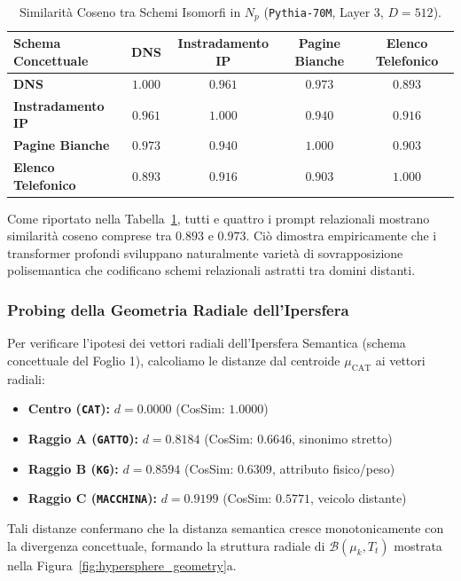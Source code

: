 \documentclass[11pt,a4paper]{article}
\theoremstyle{definition}
\begin{document}
\begin{table}[t]
\centering
\caption{Similarità Coseno tra Schemi Isomorfi in $N_p$ (\texttt{Pythia-70M}, Layer 3, $D=512$).}
\label{tab:pythia_cosine}
\vspace{0.15cm}
\small
\setlength{\tabcolsep}{6.0pt}
\begin{tabular}{@{}lcccc@{}}
\toprule
\textbf{Schema Concettuale} & \textbf{DNS} & \textbf{Instradamento IP} & \textbf{Pagine Bianche} & \textbf{Elenco Telefonico} \\ \midrule
\textbf{DNS} & $1.000$ & $0.961$ & $0.973$ & $0.893$ \\
\textbf{Instradamento IP} & $0.961$ & $1.000$ & $0.940$ & $0.916$ \\
\textbf{Pagine Bianche} & $0.973$ & $0.940$ & $1.000$ & $0.903$ \\
\textbf{Elenco Telefonico} & $0.893$ & $0.916$ & $0.903$ & $1.000$ \\ \bottomrule
\end{tabular}
\end{table}

Come riportato nella Tabella~\ref{tab:pythia_cosine}, tutti e quattro i prompt relazionali mostrano similarità coseno comprese tra $\mathbf{0.893}$ e $\mathbf{0.973}$. Ciò dimostra empiricamente che i transformer profondi sviluppano naturalmente varietà di sovrapposizione polisemantica che codificano schemi relazionali astratti tra domini distanti.

\subsubsection{Probing della Geometria Radiale dell'Ipersfera}
Per verificare l'ipotesi dei vettori radiali dell'Ipersfera Semantica (schema concettuale del Foglio 1), calcoliamo le distanze dal centroide $\mu_{\mathrm{CAT}}$ ai vettori radiali:
\begin{itemize}[leftmargin=*, itemsep=2.0pt]
    \item \textbf{Centro (\texttt{CAT}):} $d = 0.0000$ (CosSim: $1.0000$)
    \item \textbf{Raggio A (\texttt{GATTO}):} $d = 0.8184$ (CosSim: $0.6646$, sinonimo stretto)
    \item \textbf{Raggio B (\texttt{KG}):} $d = 0.8594$ (CosSim: $0.6309$, attributo fisico/peso)
    \item \textbf{Raggio C (\texttt{MACCHINA}):} $d = 0.9199$ (CosSim: $0.5771$, veicolo distante)
\end{itemize}
Tali distanze confermano che la distanza semantica cresce monotonicamente con la divergenza concettuale, formando la struttura radiale di $\mathcal{B}(\mu_k, T_t)$ mostrata nella Figura~\ref{fig:hypersphere_geometry}a.
\end{document}
